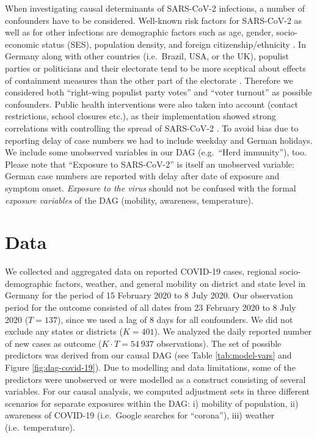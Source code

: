 \documentclass[]{elsarticle} %
\begin{document}
When investigating causal determinants of SARS-CoV-2 infections, a number of confounders have to be considered. Well-known risk factors for SARS-CoV-2 as well as for other infections are demographic factors such as age, gender, socio-economic status (SES), population density, and foreign citizenship/ethnicity \citep{de2020risk, Dragano2020.06.17.20133918, jhucovid19db2020}. In Germany along with other countries (i.e.~Brazil, USA, or the UK), populist parties or politicians and their electorate tend to be more sceptical about effects of containment measures than the other part of the electorate \citep{dohle_wingen_schreiber_2020, engle_staying_2020}. Therefore we considered both ``right-wing populist party votes'' and ``voter turnout'' as possible confounders. Public health interventions were also taken into account (contact restrictions, school closures etc.), as their implementation showed strong correlations with controlling the spread of SARS-CoV-2 \citep{cowling2020impact, juni_impact_2020, lai_effect_2020}. To avoid bias due to reporting delay of case numbers we had to include weekday and German holidays. We include some unobserved variables in our DAG (e.g.~``Herd immunity''), too. Please note that ``Exposure to SARS-CoV-2'' is itself an unobserved variable: German case numbers are reported with delay after date of exposure and symptom onset. \emph{Exposure to the virus} should not be confused with the formal \emph{exposure variables} of the DAG (mobility, awareness, temperature).

\hypertarget{data}{%
\section{Data}\label{data}}

We collected and aggregated data on reported COVID-19 cases, regional socio-demographic factors, weather, and general mobility on district and state level in Germany for the period of 15 February 2020 to 8 July 2020. Our observation period for the outcome consisted of all dates from 23 February 2020 to 8 July 2020 (\(T=137\)), since we used a lag of 8 days for all confounders. We did not exclude any states or districts (\(K=401\)). We analyzed the daily reported number of new cases as outcome (\(K\cdot T=54{\ }937\) observations). The set of possible predictors was derived from our causal DAG (see Table \ref{tab:model-vars} and Figure \ref{fig:dag-covid-19}). Due to modelling and data limitations, some of the predictors were unobserved or were modelled as a construct consisting of several variables. For our causal analysis, we computed adjustment sets in three different scenarios for separate exposures within the DAG: i) mobility of population, ii) awareness of COVID-19 (i.e.~Google searches for ``corona''), iii) weather (i.e.~temperature).
\end{document}
